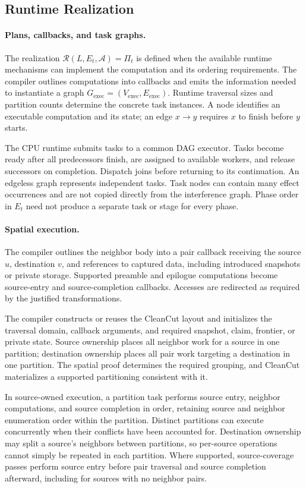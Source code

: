\subsection{Runtime Realization}
\label{app:p1-runtime}
\paragraph{Plans, callbacks, and task graphs.}
The realization $\mathcal R(L,E_t,\mathcal A)=\Pi_t$ is defined when the
available runtime mechanisms can implement the computation and its
ordering requirements. The compiler outlines computations into callbacks
and emits the information needed to instantiate a graph
$G_{\mathrm{exec}}=(V_{\mathrm{exec}},E_{\mathrm{exec}})$.
Runtime traversal sizes and partition counts determine the concrete task
instances. A node identifies an executable computation and its state;
an edge $x\rightarrow y$ requires $x$ to finish before $y$ starts.

The CPU runtime submits tasks to a common DAG executor. Tasks become
ready after all predecessors finish, are assigned to available workers,
and release successors on completion. Dispatch joins before returning
to its continuation. An edgeless graph represents independent tasks.
Task nodes can contain many effect occurrences and are not copied
directly from the interference graph. Phase order in $E_t$ need not
produce a separate task or stage for every phase.

\paragraph{Spatial execution.}
The compiler outlines the neighbor body into a pair callback receiving
the source $u$, destination $v$, and references to captured data,
including introduced snapshots or private storage. Supported preamble
and epilogue computations become source-entry and source-completion
callbacks. Accesses are redirected as required by the justified
transformations.

The compiler constructs or reuses the CleanCut layout and initializes
the traversal domain, callback arguments, and required snapshot, claim,
frontier, or private state. Source ownership places all neighbor work
for a source in one partition; destination ownership places all pair
work targeting a destination in one partition. The spatial proof
determines the required grouping, and CleanCut materializes a supported
partitioning consistent with it.

In source-owned execution, a partition task performs source entry,
neighbor computations, and source completion in order, retaining source
and neighbor enumeration order within the partition. Distinct partitions
can execute concurrently when their conflicts have been accounted for.
Destination ownership may split a source's neighbors between partitions,
so per-source operations cannot simply be repeated in each partition.
Where supported, source-coverage passes perform source entry before
pair traversal and source completion afterward, including for sources
with no neighbor pairs.

